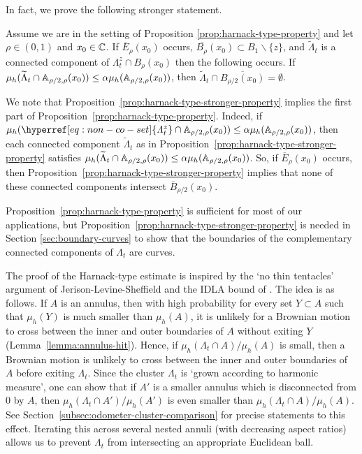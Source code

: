 \documentclass[12pt]{amsart}
\numberwithin{equation}{section}
\newcommand{\cluster}[2]{\hyperref[eq:non-co-set]{\mathit{\Lambda}^{#1}_{#2}}}
\begin{document}
	
	In fact, we prove the following stronger statement. 
	
	\begin{prop} \label{prop:harnack-type-stronger-property}
		Assume we are in the setting of Proposition \ref{prop:harnack-type-property} and let $\rho \in (0,1)$ and $x_0 \in \mathbb{C}$. If $\overline E_\rho(x_0)$ occurs, $\overline{B_{\rho}}(x_0) \subset B_1 \backslash \{z\}$, and $\widetilde\Lambda_t$ is a connected component of ${\cluster{z}{t}} \cap B_{\rho}(x_0)$ 
		then the following occurs.  If $\mu_h(\widetilde \Lambda_t \cap \mathbb{A}_{\rho/2, \rho}(x_0)) \leq \alpha \mu_h(\mathbb{A}_{\rho/2, \rho}(x_0))$, then $\widetilde \Lambda_t \cap \overline{B_{\rho/2}(x_0)} = \emptyset$. 
	\end{prop}
	
	We note that Proposition~\ref{prop:harnack-type-stronger-property} implies the first part of Proposition~\ref{prop:harnack-type-property}. Indeed, if $\mu_h({\cluster{z}{t}} \cap \A_{\rho/2, \rho}(x_0)) \leq \alpha \mu_h(\A_{\rho/2, \rho}(x_0))$, then each connected component $\widetilde\Lambda_t$ as in Proposition~\ref{prop:harnack-type-stronger-property} satisfies $\mu_h(\widetilde \Lambda_t \cap \mathbb{A}_{\rho/2, \rho}(x_0)) \leq \alpha \mu_h(\mathbb{A}_{\rho/2, \rho}(x_0))$. So, if $\overline E_\rho(x_0)$ occurs, then Proposition~\ref{prop:harnack-type-stronger-property} implies that none of these connected components intersect $\overline B_{\rho/2}(x_0)$.  
	
	Proposition~\ref{prop:harnack-type-property} is sufficient for most of our applications, but Proposition~\ref{prop:harnack-type-stronger-property} is needed in Section \ref{sec:boundary-curves} to show that the boundaries
	of the complementary connected components of ${\cluster{}{t}}$ are curves. 
	
	The proof of the Harnack-type estimate is inspired by the `no thin tentacles' argument of Jerison-Levine-Sheffield \cite{jerison2012logarithmic}
	and the IDLA bound of \cite{duminil2013containing}. 
	The idea is as follows. If $A$ is an annulus, then with high probability for every set $Y\subset A$ such that $\mu_h(Y)$ is much smaller than $\mu_h(A)$, it is unlikely for a Brownian motion to cross between the inner and outer boundaries of $A$ without exiting $Y$ (Lemma~\ref{lemma:annulus-hit}). Hence, if $\mu_h({\cluster{}{t}} \cap A) / \mu_h(A)$ is small, then a Brownian motion is unlikely to cross between the inner and outer boundaries of $A$ before exiting ${\cluster{}{t}}$. Since the cluster ${\cluster{}{t}}$ is `grown according to harmonic measure', one can show that if $A'$ is a smaller annulus which is disconnected from 0 by $A$, then $\mu_h({\cluster{}{t}} \cap A') / \mu_h(A')$ is even smaller than $\mu_h({\cluster{}{t}} \cap A) / \mu_h(A)$. See Section~\ref{subsec:odometer-cluster-comparison} for precise statements to this effect. Iterating this across several nested annuli (with decreasing aspect ratios) allows us to prevent ${\cluster{}{t}}$ from intersecting an appropriate Euclidean ball.
	
\end{document}
